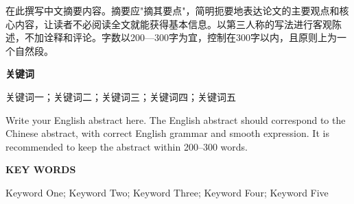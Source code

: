 \begin{abstractcn}
    在此撰写中文摘要内容。摘要应"摘其要点"，简明扼要地表达论文的主要观点和核心内容，让读者不必阅读全文就能获得基本信息。以第三人称的写法进行客观陈述，不加诠释和评论。字数以200—300字为宜，控制在300字以内，且原则上为一个自然段。

    \vspace*{\baselineskip}
    \begin{center}
        \heiti\bfseries 关键词
    \end{center}
    \vspace*{\baselineskip}
    \noindent
    \songti 关键词一；关键词二；关键词三；关键词四；关键词五

\end{abstractcn}

\begin{abstracten}
    Write your English abstract here. The English abstract should correspond to the Chinese abstract, with correct English grammar and smooth expression. It is recommended to keep the abstract within 200--300 words.

    \vspace*{\baselineskip}
    \begin{center}
        \textbf{KEY WORDS}
    \end{center}
    \vspace*{\baselineskip}
    \noindent
     Keyword One; Keyword Two; Keyword Three; Keyword Four; Keyword Five
\end{abstracten}
